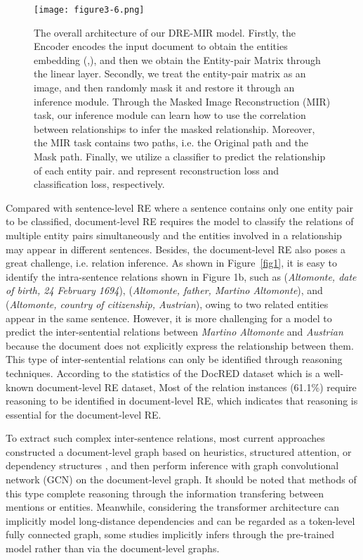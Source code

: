 \documentclass{article}
\begin{document}
\begin{figure*}[t]
\centering
\texttt{[image: figure3-6.png]} \caption{The overall architecture of our DRE-MIR model. 
Firstly, the Encoder encodes the input document to obtain the entities embedding (,), and then we obtain the Entity-pair Matrix  through the linear layer.
Secondly, we treat the entity-pair matrix  as an image, and then randomly mask it and
restore it through an inference module. 
Through the Masked Image Reconstruction (MIR) task, our inference module can learn how to use the correlation between relationships to infer the masked relationship.
Moreover, the MIR task contains two paths, i.e. the Original path and the Mask path.
Finally, we utilize a classifier to predict the relationship of each entity pair.
 and  represent reconstruction loss and classification loss, respectively.
}
\label{fig3}
\end{figure*}


Compared with sentence-level RE where a sentence contains only one entity pair to be classified, document-level RE requires the model to classify the relations of multiple entity pairs simultaneously and the entities involved in a relationship may appear in different sentences.
Besides, the document-level RE also poses a great challenge, i.e. relation inference. 
As shown in Figure~\ref{fig1}, it is easy to identify the intra-sentence relations shown in Figure 1b, such as (\textit{Altomonte, date of birth, 24 February 1694}), (\textit{Altomonte, father, Martino Altomonte}), and (\textit{Altomonte, country of citizenship, Austrian}), owing to two related entities appear in the same sentence.
However, it is more challenging for a model to predict the inter-sentential relations between \textit{Martino Altomonte} and \textit{Austrian} because the document does not explicitly express the relationship between them.
This type of inter-sentential relations can only be identified through reasoning techniques.
According to the statistics of the DocRED \cite{c:8} dataset which is a well-known document-level RE dataset, Most of the relation instances (61.1\%) require reasoning to be identified in document-level RE, which indicates that reasoning is essential for the document-level RE.

To extract such complex inter-sentence relations, most current approaches constructed a document-level graph based on heuristics, structured attention, or dependency structures \cite{c:10,c:14,c:15,c:16}, and then perform inference with graph convolutional network (GCN) \cite{c:17,c:18} on the document-level graph.
It should be noted that methods of this type complete reasoning through the information transfering between mentions or entities.
Meanwhile, considering the transformer architecture can implicitly model long-distance dependencies and can be regarded as a token-level fully connected graph, some studies \cite{c:19,c:11} implicitly infers through the pre-trained model rather than via the document-level graphs.
\end{document}
